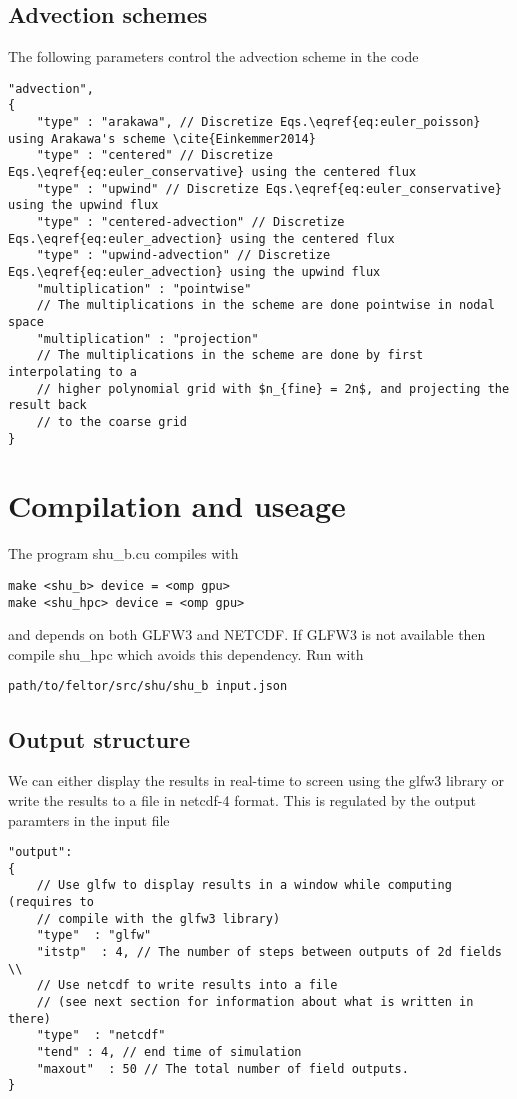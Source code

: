 \subsection{Advection schemes}
The following parameters control the advection scheme in the code
\begin{verbatim}
"advection",
{
    "type" : "arakawa", // Discretize Eqs.\eqref{eq:euler_poisson} using Arakawa's scheme \cite{Einkemmer2014}
    "type" : "centered" // Discretize Eqs.\eqref{eq:euler_conservative} using the centered flux
    "type" : "upwind" // Discretize Eqs.\eqref{eq:euler_conservative} using the upwind flux
    "type" : "centered-advection" // Discretize Eqs.\eqref{eq:euler_advection} using the centered flux
    "type" : "upwind-advection" // Discretize Eqs.\eqref{eq:euler_advection} using the upwind flux
    "multiplication" : "pointwise"
    // The multiplications in the scheme are done pointwise in nodal space
    "multiplication" : "projection"
    // The multiplications in the scheme are done by first interpolating to a
    // higher polynomial grid with $n_{fine} = 2n$, and projecting the result back
    // to the coarse grid
}
\end{verbatim}

\section{Compilation and useage}
The program shu\_b.cu compiles with
\begin{verbatim}
make <shu_b> device = <omp gpu>
make <shu_hpc> device = <omp gpu>
\end{verbatim}
and depends on both GLFW3 and NETCDF. If GLFW3 is not available then compile shu\_hpc which avoids this dependency.
Run with
\begin{verbatim}
path/to/feltor/src/shu/shu_b input.json
\end{verbatim}

\subsection{Output structure}

We can either display the results in real-time to screen using the glfw3 library or
write the results to a file in netcdf-4 format.
This is regulated by the output paramters in the input file
\begin{verbatim}
"output":
{
    // Use glfw to display results in a window while computing (requires to
    // compile with the glfw3 library)
    "type"  : "glfw"
    "itstp"  : 4, // The number of steps between outputs of 2d fields \\
    // Use netcdf to write results into a file
    // (see next section for information about what is written in there)
    "type"  : "netcdf"
    "tend" : 4, // end time of simulation
    "maxout"  : 50 // The total number of field outputs.
}
\end{verbatim}
